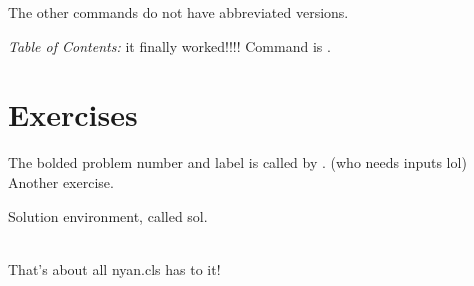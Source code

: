 \documentclass[labelsBySect]{nyan}
\begin{document}
The other commands do not have abbreviated versions.

\emph{Table of Contents: }it finally worked!!!! Command is .

\section{Exercises}
\noindent
\exercise The bolded problem number and label is called by . (who needs inputs lol)
 Another exercise. 
\begin{sol}
Solution environment, called sol.
\end{sol}
\\[4pt]
That's about all nyan.cls has to it!\\

\end{document}
